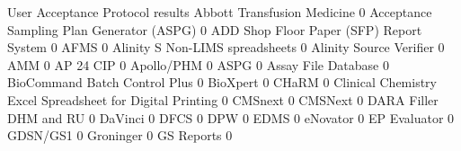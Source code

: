 \documentclass{article}
\begin{document}
\begin{Schunk}
\begin{Soutput}
                                                            User Acceptance Protocol results
  Abbott Transfusion Medicine                                                              0
  Acceptance Sampling Plan Generator (ASPG)                                                0
  ADD Shop Floor Paper (SFP) Report System                                                 0
  AFMS                                                                                     0
  Alinity S Non-LIMS spreadsheets                                                          0
  Alinity Source Verifier                                                                  0
  AMM                                                                                      0
  AP 24 CIP                                                                                0
  Apollo/PHM                                                                               0
  ASPG                                                                                     0
  Assay File Database                                                                      0
  BioCommand Batch Control Plus                                                            0
  BioXpert                                                                                 0
  CHaRM                                                                                    0
  Clinical Chemistry Excel Spreadsheet for Digital Printing                                0
  CMSnext                                                                                  0
  CMSNext                                                                                  0
  DARA Filler DHM and RU                                                                   0
  DaVinci                                                                                  0
  DFCS                                                                                     0
  DPW                                                                                      0
  EDMS                                                                                     0
  eNovator                                                                                 0
  EP Evaluator                                                                             0
  GDSN/GS1                                                                                 0
  Groninger                                                                                0
  GS Reports                                                                               0

\end{Soutput}
\end{Schunk}
\end{document}
